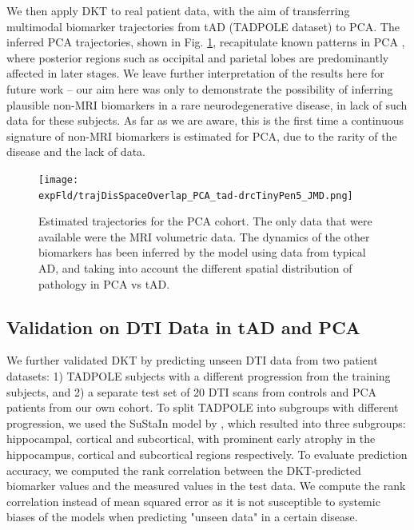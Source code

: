 \documentclass{llncs}
\begin{document}
We then apply DKT to real patient data, with the aim of transferring multimodal biomarker trajectories from tAD (TADPOLE dataset) to PCA. The inferred PCA trajectories, shown in Fig. \ref{fig:PCAtrajByModality}, recapitulate known patterns in PCA \cite{crutch2012posterior}, where posterior regions such as occipital and parietal lobes are predominantly affected in later stages. We leave further interpretation of the results here for future work -- our aim here was only to demonstrate the possibility of inferring plausible non-MRI biomarkers in a rare neurodegenerative disease, in lack of such data for these subjects. As far as we are aware, this is the first time a continuous signature of non-MRI biomarkers is estimated for PCA, due to the rarity of the disease and the lack of data. 


\begin{figure}[htp]
\centering
 \texttt{[image: \\expFld/trajDisSpaceOverlap\_PCA\_tad-drcTinyPen5\_JMD.png]}
 \caption{Estimated trajectories for the PCA cohort. The only data that were available were the MRI volumetric data. The dynamics of the other biomarkers has been inferred by the model using data from typical AD, and taking into account the different spatial distribution of pathology in PCA vs tAD. }
 \label{fig:PCAtrajByModality}
\end{figure}


\subsection{Validation on DTI Data in tAD and PCA}
\label{sec:dktResVal}

We further validated DKT by predicting unseen DTI data from two patient datasets: 1) TADPOLE subjects with a different progression from the training subjects, and 2) a separate test set of 20 DTI scans from controls and PCA patients from our own cohort. To split TADPOLE into subgroups with different progression, we used the SuStaIn model by \cite{young2018uncovering}, which resulted into three subgroups: hippocampal, cortical and subcortical, with prominent early atrophy in the hippocampus, cortical and subcortical regions respectively. To evaluate prediction accuracy, we computed the rank correlation between the DKT-predicted biomarker values and the measured values in the test data. We compute the rank correlation instead of mean squared error as it is not susceptible to systemic biases of the models when predicting "unseen data" in a certain disease.
\end{document}

